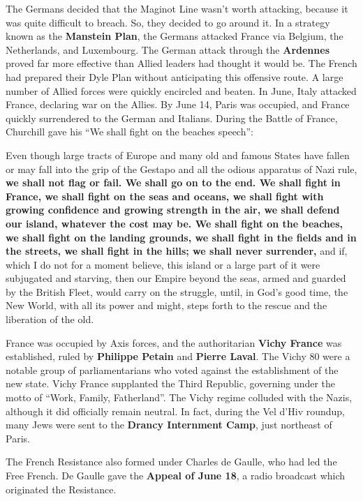 The Germans decided that the Maginot Line wasn't worth attacking, because it was quite difficult to breach.
So, they decided to go around it.
In a strategy known as the \textbf{Manstein Plan},
the Germans attacked France via Belgium, the Netherlands, and Luxembourg.
The German attack through the \textbf{Ardennes} proved far more effective than Allied leaders had thought it would be.
The French had prepared their Dyle Plan without anticipating this offensive route.
A large number of Allied forces were quickly encircled and beaten.
In June, Italy attacked France, declaring war on the Allies.
By June 14, Paris was occupied, and France quickly surrendered to the German and Italians.
During the Battle of France, Churchill gave his ``We shall fight on the beaches speech'':
\begin{quoting}
  Even though large tracts of Europe and many old and famous States have fallen
  or may fall into the grip of the Gestapo and all the odious apparatus of Nazi rule,
  \textbf{%
    we shall not flag or fail.
    We shall go on to the end.
    We shall fight in France, we shall fight on the seas and oceans,
    we shall fight with growing confidence and growing strength in the air,
    we shall defend our island, whatever the cost may be.
    We shall fight on the beaches,
    we shall fight on the landing grounds,
    we shall fight in the fields and in the streets,
    we shall fight in the hills; we shall never surrender,
  }
  and if, which I do not for a moment believe,
  this island or a large part of it were subjugated and starving,
  then our Empire beyond the seas, armed and guarded by the British Fleet, would carry on the struggle,
  until, in God's good time, the New World, with all its power and might,
  steps forth to the rescue and the liberation of the old.
\end{quoting}

France was occupied by Axis forces, and the authoritarian \textbf{Vichy France} was established,
ruled by \textbf{Philippe Petain} and \textbf{Pierre Laval}.
The Vichy 80 were a notable group of parliamentarians who voted against the establishment of the new state.
Vichy France supplanted the Third Republic, governing under the motto of ``Work, Family, Fatherland''.
The Vichy regime colluded with the Nazis, although it did officially remain neutral.
In fact, during the Vel d'Hiv roundup, many Jews were sent to the \textbf{Drancy Internment Camp},
just northeast of Paris.

The French Resistance also formed under Charles de Gaulle, who had led the Free French.
De Gaulle gave the \textbf{Appeal of June 18}, a radio broadcast which originated the Resistance.

